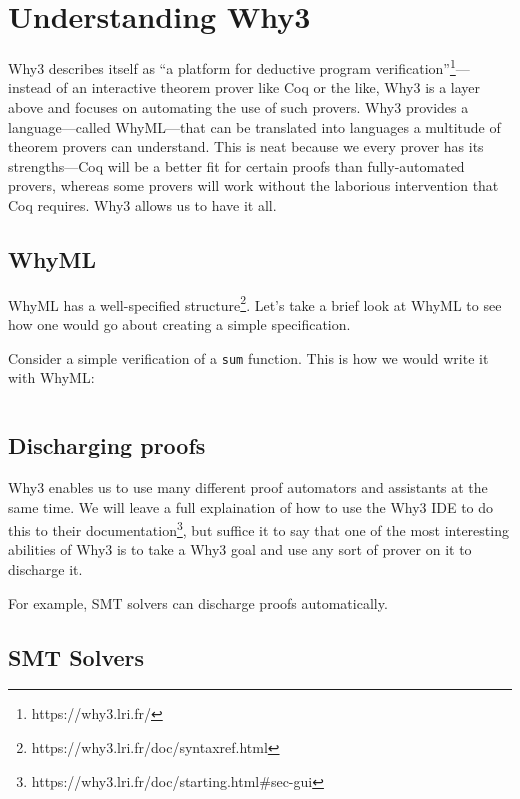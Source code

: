 \documentclass[12pt]{article}
\begin{document}

\section{Understanding Why3}
\label{why-why3}

Why3 describes itself as ``a platform for deductive program verification''\footnote{https://why3.lri.fr/}---instead of an interactive theorem prover like Coq or the like, Why3 is a layer above and focuses on automating the use of such provers.\cite{bobotWhy3ShepherdYour}
Why3 provides a language---called WhyML---that can be translated into languages a multitude of theorem provers can understand.
This is neat because we every prover has its strengths---Coq will be a better fit for certain proofs than fully-automated provers, whereas some provers will work without the laborious intervention that Coq requires.
Why3 allows us to have it all.

\subsection{WhyML}

WhyML has a well-specified structure\footnote{https://why3.lri.fr/doc/syntaxref.html}.
Let's take a brief look at WhyML to see how one would go about creating a simple specification.

Consider a simple verification of a \texttt{sum} function. This is how we would write it with WhyML:

\begin{verbatim}
\end{verbatim}

\subsection{Discharging proofs}

Why3 enables us to use many different proof automators and assistants at the same time.
We will leave a full explaination of how to use the Why3 IDE to do this to their documentation\footnote{https://why3.lri.fr/doc/starting.html#sec-gui}, but suffice it to say that one of the most interesting abilities of Why3 is to take a Why3 goal and use any sort of prover on it to discharge it.

For example, SMT solvers can discharge proofs automatically.

\subsection{SMT Solvers}
\end{document}
